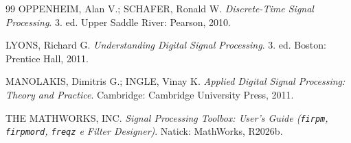 \documentclass[11pt,a4paper]{article}
\begin{document}
\begin{thebibliography}{99}
OPPENHEIM, Alan V.; SCHAFER, Ronald W. \textit{Discrete-Time Signal Processing}. 3. ed. Upper Saddle River: Pearson, 2010.

LYONS, Richard G. \textit{Understanding Digital Signal Processing}. 3. ed. Boston: Prentice Hall, 2011.

MANOLAKIS, Dimitris G.; INGLE, Vinay K. \textit{Applied Digital Signal Processing: Theory and Practice}. Cambridge: Cambridge University Press, 2011.

THE MATHWORKS, INC. \textit{Signal Processing Toolbox: User's Guide (\texttt{firpm}, \texttt{firpmord}, \texttt{freqz} e Filter Designer)}. Natick: MathWorks, R2026b.

\end{thebibliography}
\endgroup
\end{document}
